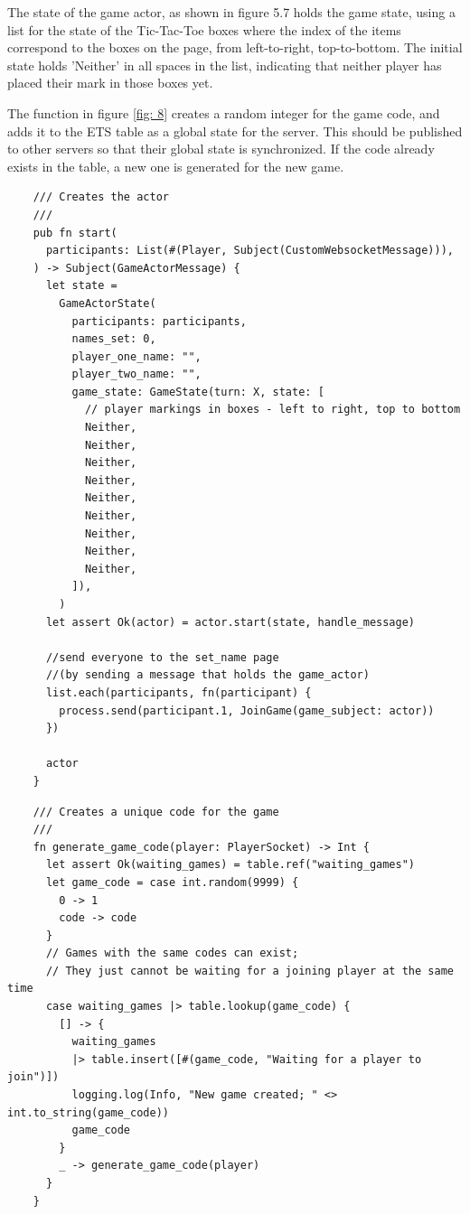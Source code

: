 \documentclass[]{interim}
\begin{document}
\begin{minipage}[t]{18em}
  The state of the game actor, as shown in figure 5.7
  holds the game state, using a list for the state of the Tic-Tac-Toe boxes
  where the index of the items correspond to the boxes on the page, from
  left-to-right, top-to-bottom. The initial state holds 'Neither' in
  all spaces in the list, indicating that neither player has placed
  their mark in those boxes yet.

  \vspace*{28em}

  The function in figure \ref{fig: 8} creates a random integer for the game code,
  and adds it to the ETS table as a global state for the server. This should be
  published to other servers so that their global state is synchronized. If the
  code already exists in the table, a new one is generated for the new game.
\end{minipage}
\hfill
\begin{minipage}[t]{20em}
  \begin{lstlisting}
    /// Creates the actor
    ///
    pub fn start(
      participants: List(#(Player, Subject(CustomWebsocketMessage))),
    ) -> Subject(GameActorMessage) {
      let state =
        GameActorState(
          participants: participants,
          names_set: 0,
          player_one_name: "",
          player_two_name: "",
          game_state: GameState(turn: X, state: [
            // player markings in boxes - left to right, top to bottom
            Neither,
            Neither,
            Neither,
            Neither,
            Neither,
            Neither,
            Neither,
            Neither,
            Neither,
          ]),
        )
      let assert Ok(actor) = actor.start(state, handle_message)

      //send everyone to the set_name page
      //(by sending a message that holds the game_actor)
      list.each(participants, fn(participant) {
        process.send(participant.1, JoinGame(game_subject: actor))
      })

      actor
    }
  \end{lstlisting}
  \label{fig: 7}
  \vspace*{1.5cm}
  \begin{lstlisting}
    /// Creates a unique code for the game
    ///
    fn generate_game_code(player: PlayerSocket) -> Int {
      let assert Ok(waiting_games) = table.ref("waiting_games")
      let game_code = case int.random(9999) {
        0 -> 1
        code -> code
      }
      // Games with the same codes can exist;
      // They just cannot be waiting for a joining player at the same time
      case waiting_games |> table.lookup(game_code) {
        [] -> {
          waiting_games
          |> table.insert([#(game_code, "Waiting for a player to join")])
          logging.log(Info, "New game created; " <> int.to_string(game_code))
          game_code
        }
        _ -> generate_game_code(player)
      }
    }
  \end{lstlisting}
  \label{fig: 8}
\end{minipage}
\end{document}
